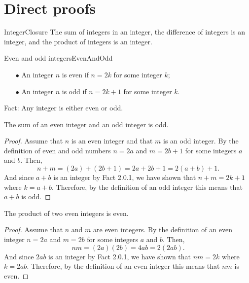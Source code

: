 \documentclass{report}
\begin{document}
\chapter{Direct proofs}

\begin{fact}{}{IntegerClosure}
  The sum of integers in an integer, the difference of integers is an integer, and the product of integers is an integer.
\end{fact}

\begin{definition}{Even and odd integers}{EvenAndOdd}
  \begin{itemize}
    \item[$\bullet$] An integer $n$ is even if $n = 2k$ for some integer $k$;
    \item[$\bullet$] An integer $n$ is odd if $n = 2k + 1$ for some integer $k$.
  \end{itemize}

  Fact: Any integer is either even or odd.

\end{definition}

\begin{proposition*}{}
  The sum of an even integer and an odd integer is odd.
\end{proposition*}

\begin{proof}
  Assume that $n$ is an even integer and that $m$ is an odd integer.
  By the definition of even and odd numbers $n = 2a$ and $m = 2b + 1$ for some integers $a$ and $b$.
  Then, $$n + m = (2a) + (2b + 1) = 2a + 2b + 1 = 2(a + b) + 1.$$
  And since $a + b$ is an integer by Fact 2.0.1, we have shown that $n + m = 2k + 1$ where $k = a + b$.
  Therefore, by the definition of an odd integer this means that $a + b$ is odd.
\end{proof}

\begin{proposition*}{}
  The product of two even integers is even.
\end{proposition*}

\begin{proof}
  Assume that $n$ and $m$ are even integers.
  By the definition of an even integer $n = 2a$ and $m = 2b$ for some integers $a$ and $b$.
  Then, $$nm = (2a)(2b) = 4ab = 2(2ab).$$
  And since $2ab$ is an integer by Fact 2.0.1, we have shown that $nm = 2k$ where $k = 2ab$.
  Therefore, by the definition of an even integer this means that $nm$ is even.
\end{proof}
\end{document}
